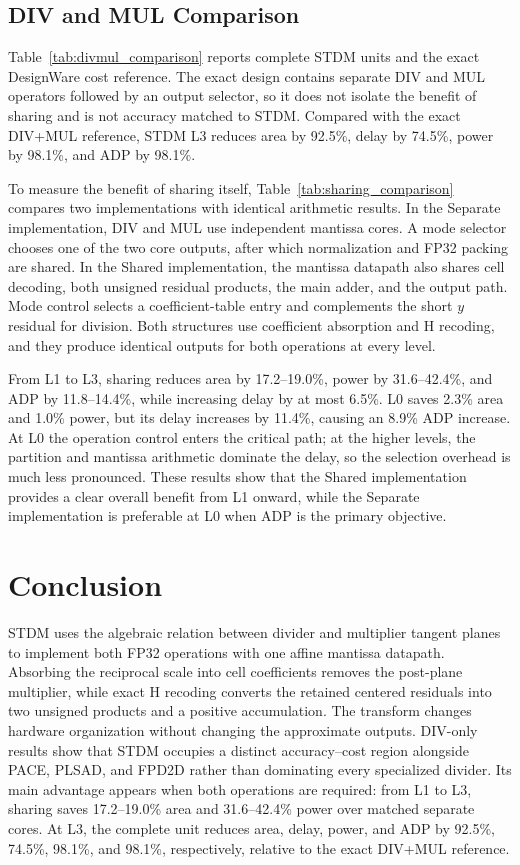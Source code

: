 \documentclass[conference]{IEEEtran}
\begin{document}
\subsection{DIV and MUL Comparison}
\label{sec:divmul-comparison}
Table~\ref{tab:divmul_comparison} reports complete STDM units and the exact
DesignWare cost reference. The exact design contains separate DIV and MUL
operators followed by an output selector, so it does not isolate the benefit
of sharing and is not accuracy matched to STDM. Compared with
the exact DIV+MUL reference, STDM L3 reduces area by 92.5\%, delay by 74.5\%,
power by 98.1\%, and ADP by 98.1\%.

To measure the benefit of sharing itself, Table~\ref{tab:sharing_comparison}
compares two implementations with identical arithmetic results. In the
Separate implementation, DIV and MUL use independent mantissa cores. A mode
selector chooses one of the two core outputs, after which normalization and
FP32 packing are shared. In the Shared implementation, the mantissa datapath
also shares cell decoding, both unsigned residual products, the main adder, and
the output path. Mode control selects a coefficient-table entry and complements
the short $y$ residual for division. Both structures use coefficient absorption
and H recoding, and they produce identical outputs for both operations at every
level.

From L1 to L3, sharing reduces area by 17.2--19.0\%, power by 31.6--42.4\%,
and ADP by 11.8--14.4\%, while increasing delay by at most 6.5\%. L0 saves
2.3\% area and 1.0\% power, but its delay increases by 11.4\%, causing an
8.9\% ADP increase. At L0 the operation control enters the critical path;
at the higher levels, the partition and mantissa arithmetic dominate the delay,
so the selection overhead is much less pronounced. These results show that the
Shared implementation provides a clear overall benefit from L1 onward, while
the Separate implementation is preferable at L0 when ADP is the primary
objective.

\section{Conclusion}
STDM uses the algebraic relation between divider and multiplier tangent planes
to implement both FP32 operations with one affine mantissa datapath. Absorbing
the reciprocal scale into cell coefficients removes the post-plane multiplier,
while exact H recoding converts the retained centered residuals into two
unsigned products and a positive accumulation. The transform changes hardware
organization without changing the approximate outputs. DIV-only results show
that STDM occupies a distinct accuracy--cost region alongside PACE, PLSAD, and
FPD2D rather than dominating every specialized divider. Its main advantage
appears when both operations are required: from L1 to L3, sharing saves
17.2--19.0\% area and 31.6--42.4\% power over matched separate cores. At L3,
the complete unit reduces area, delay, power, and ADP by 92.5\%, 74.5\%,
98.1\%, and 98.1\%, respectively, relative to the exact DIV+MUL reference.
\end{document}
